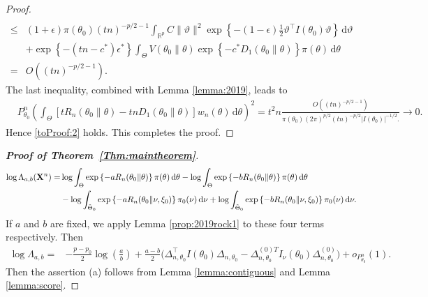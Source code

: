 \documentclass[11pt]{article}
\newcommand{\myT}{\intercal}
\theoremstyle{plain}
\theoremstyle{definition}
\theoremstyle{remark}
\begin{document}
\begin{appendices}
\begin{proof}
\begin{align*}
     \\
     \leq&
    (1+\epsilon) \pi(\theta_0)
    (tn)^{-p/2 - 1}
     \int_{ \mathbb R^p}
     C\|\vartheta \|^2
     \exp\left\{ - (1-\epsilon) \frac{1}{2}  \vartheta^\myT I(\theta_0) \vartheta \right\} 
     \, \mathrm d \vartheta
     \\
     &+
     \exp\left\{ -(tn- c^*) \epsilon^* \right\} \int_{\Theta} V(\theta_0 \| \theta) \exp\left\{ - c^* D_1(\theta_0 \| \theta) \right\} \pi(\theta) \, \mathrm d \theta
     \\
     =&
     O\left( (tn)^{ - p/2 - 1 }\right)
     .
\end{align*}
The last inequality, combined with Lemma \ref{lemma:2019}, leads to
\begin{align*}
    &
    P_{\theta_0}^n
    \left( 
    \int_{\Theta}
    \left[   t R_n(\theta_0\| \theta) - tn D_1 (\theta_0 \| \theta )  \right]
    w_n (\theta) \, \mathrm d \theta
    \right)^2
    =
    t^2 n
    \frac{
        O\left( 
         (tn)^{-p/2-1}
    \right)
}
{
    \pi(\theta_0)
    \left( 
        {2\pi}
    \right)^{p/2}
    \left( 
    { tn}
\right)^{-p/2}
    | I (\theta_0) |^{-1/2}. 
}
\to 0
    .
\end{align*}
Hence \eqref{toProof:2} holds.
This completes the proof.

\end{proof}





    \begin{proof}[\textbf{Proof of Theorem~\ref{Thm:maintheorem}}]
$$
\begin{aligned}
    \log \Lambda_{a,b} (\mathbf{X}^n)
    =&
    \log\int_{\Theta}
    \exp\left\{-a R_n(\theta_0\| \theta) \right\} \pi(\theta)
\, \mathrm d \theta
-
    \log\int_{\Theta}
    \exp\left\{-b R_n(\theta_0\| \theta) \right\} \pi(\theta)
\, \mathrm d \theta
    \\
    &
    -\log\int_{\tilde \Theta_0}
    \exp\left\{-a R_n(\theta_0\| \nu, \xi_0) \right\} \pi_0(\nu)
\, \mathrm d \nu
+\log\int_{\tilde \Theta_0}
    \exp\left\{-b R_n(\theta_0\| \nu, \xi_0) \right\} \pi_0(\nu)
\, \mathrm d \nu
.
\end{aligned}
$$
If $a$ and $b$ are fixed, we apply Lemma \ref{prop:2019rock1} to these four terms respectively.
Then
        \begin{align*}
\log \Lambda_{a,b}
    =&
    -\frac{p-p_0}{2}\log \left(\frac{a}{b}\right)
    +
    \frac{a-b}{2}\Big(
        \Delta_{n,\theta_0}^\myT  I(\theta_0) \Delta_{n,\theta_0}
    -
    \Delta_{n,\theta_0}^{{(0)}T} I_{\nu}(\theta_0) \Delta^{(0)}_{n,\theta_0}
    \Big)
    +o_{P^n_{\theta_0}}(1).
        \end{align*}
        Then the assertion (a) follows from Lemma \ref{lemma:contiguous} and Lemma \ref{lemma:score}.


\end{proof}
\end{appendices}
\end{document}
